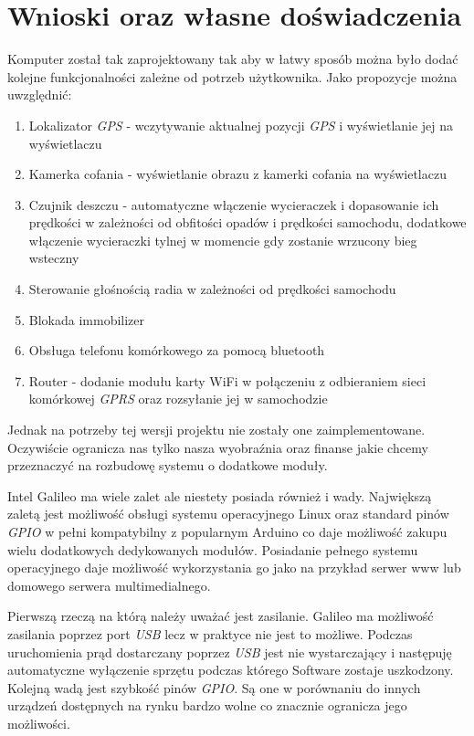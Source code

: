 \documentclass{xmgr}
\begin{document}
\section{Wnioski oraz własne doświadczenia}
Komputer został tak zaprojektowany tak aby w łatwy sposób można było dodać kolejne funkcjonalności zależne od potrzeb użytkownika. Jako propozycje można uwzględnić:
\begin{enumerate}
	\item Lokalizator \emph{GPS} - wczytywanie aktualnej pozycji \emph{GPS} i wyświetlanie jej na wyświetlaczu
	\item Kamerka cofania - wyświetlanie obrazu z kamerki cofania na wyświetlaczu
	\item Czujnik deszczu - automatyczne włączenie wycieraczek i dopasowanie ich prędkości w zależności od obfitości opadów i prędkości samochodu, dodatkowe włączenie wycieraczki tylnej w momencie gdy zostanie wrzucony bieg wsteczny
	\item Sterowanie głośnością radia w zależności od prędkości samochodu
	\item Blokada immobilizer
	\item Obsługa telefonu komórkowego za pomocą bluetooth
	\item Router - dodanie modułu karty WiFi w połączeniu z odbieraniem sieci komórkowej \emph{GPRS} oraz rozsyłanie jej w samochodzie
\end{enumerate}
Jednak na potrzeby tej wersji projektu nie zostały one zaimplementowane. Oczywiście ogranicza nas tylko nasza wyobraźnia oraz finanse jakie chcemy przeznaczyć na rozbudowę systemu o dodatkowe moduły.

Intel Galileo ma wiele zalet ale niestety posiada również i wady. Największą zaletą jest możliwość obsługi systemu operacyjnego Linux oraz standard pinów \emph{GPIO} w pełni kompatybilny z popularnym Arduino co daje możliwość zakupu wielu dodatkowych dedykowanych modułów. Posiadanie pełnego systemu operacyjnego daje możliwość wykorzystania go jako na przykład serwer www lub domowego serwera multimedialnego. 

Pierwszą rzeczą na którą należy uważać jest zasilanie. Galileo ma możliwość zasilania poprzez port \emph{USB} lecz w praktyce nie jest to możliwe. Podczas uruchomienia prąd dostarczany poprzez \emph{USB} jest nie wystarczający i następuję automatyczne wyłączenie sprzętu podczas którego Software zostaje uszkodzony. Kolejną wadą jest szybkość pinów \emph{GPIO}. Są one w porównaniu do innych urządzeń dostępnych na rynku bardzo wolne co znacznie ogranicza jego możliwości.
\end{document}
